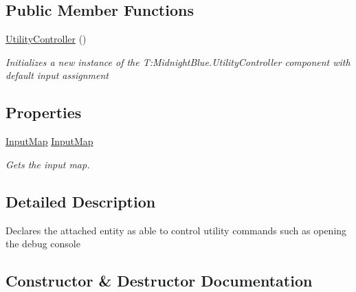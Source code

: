 \subsection*{Public Member Functions}
\begin{DoxyCompactItemize}
\item 
\hyperlink{class_midnight_blue_1_1_engine_1_1_entity_component_1_1_utility_controller_a8db1499c76ad637fab63cfde10ebe5b0}{Utility\+Controller} ()
\begin{DoxyCompactList}\small\item\em Initializes a new instance of the T\+:\+Midnight\+Blue.\+Utility\+Controller component with default input assignment \end{DoxyCompactList}\end{DoxyCompactItemize}
\subsection*{Properties}
\begin{DoxyCompactItemize}
\item 
\hyperlink{class_midnight_blue_1_1_engine_1_1_i_o_1_1_input_map}{Input\+Map} \hyperlink{class_midnight_blue_1_1_engine_1_1_entity_component_1_1_utility_controller_a624d6316ccd2a07aef190e2d56b98a17}{Input\+Map}
\begin{DoxyCompactList}\small\item\em Gets the input map. \end{DoxyCompactList}\end{DoxyCompactItemize}


\subsection{Detailed Description}
Declares the attached entity as able to control utility commands such as opening the debug console 



\subsection{Constructor \& Destructor Documentation}
\hypertarget{class_midnight_blue_1_1_engine_1_1_entity_component_1_1_utility_controller_a8db1499c76ad637fab63cfde10ebe5b0}{}\label{class_midnight_blue_1_1_engine_1_1_entity_component_1_1_utility_controller_a8db1499c76ad637fab63cfde10ebe5b0} 
